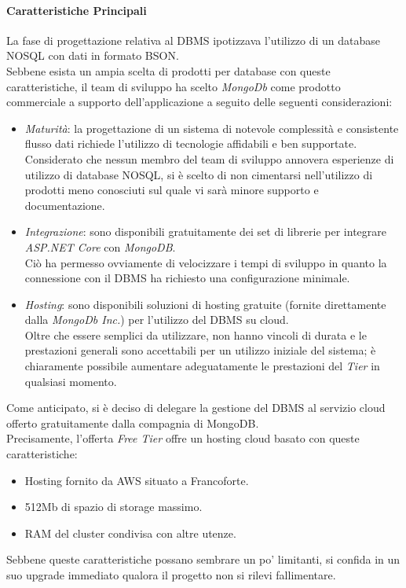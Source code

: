 \documentclass[12pt]{article}
\begin{document}
\paragraph{Caratteristiche Principali}
La fase di progettazione relativa al DBMS ipotizzava l'utilizzo di un database NOSQL con dati in formato BSON.\\
Sebbene esista un ampia scelta di prodotti per database con queste caratteristiche, il team di sviluppo ha scelto \textit{MongoDb} come prodotto commerciale a supporto dell'applicazione a seguito delle seguenti considerazioni: 
\begin{itemize}
\item \textit{Maturità}: la progettazione di un sistema di notevole complessità e consistente flusso dati richiede l'utilizzo di tecnologie affidabili e ben supportate.\\
Considerato che nessun membro del team di sviluppo annovera esperienze di utilizzo di database NOSQL, si è scelto di non cimentarsi nell'utilizzo di prodotti meno conosciuti sul quale vi sarà minore supporto e documentazione.
\item \textit{Integrazione}: sono disponibili gratuitamente dei set di librerie per integrare \textit{ASP.NET Core} con \textit{MongoDB}.\\
Ciò ha permesso ovviamente di velocizzare i tempi di sviluppo in quanto la connessione con il DBMS ha richiesto una configurazione minimale.
\item \textit{Hosting}: sono disponibili soluzioni di hosting gratuite (fornite direttamente dalla \textit{MongoDb Inc.}) per l'utilizzo del DBMS su cloud.\\
Oltre che essere semplici da utilizzare, non hanno vincoli di durata e le prestazioni generali sono accettabili per un utilizzo iniziale del sistema; è chiaramente possibile aumentare adeguatamente le prestazioni del \textit{Tier} in qualsiasi momento.
\end{itemize}
Come anticipato, si è deciso di delegare la gestione del DBMS al servizio cloud offerto gratuitamente dalla compagnia di MongoDB.\\
Precisamente, l'offerta \textit{Free Tier} offre un hosting cloud basato con queste caratteristiche:
\begin{itemize}
\item Hosting fornito da AWS situato a Francoforte.
\item 512Mb di spazio di storage massimo.
\item RAM del cluster condivisa con altre utenze.
\end{itemize}
Sebbene queste caratteristiche possano sembrare un po' limitanti, si confida in un suo upgrade immediato qualora il progetto non si rilevi fallimentare.
\newpage
\end{document}
